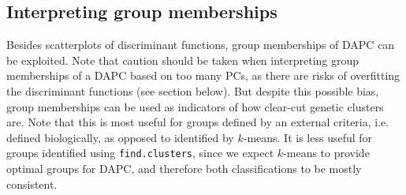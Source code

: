 \documentclass{article}
\begin{document}
\subsection{Interpreting group memberships}
Besides scatterplots of discriminant functions, group memberships of DAPC can be exploited.
Note that caution should be taken when interpreting group memberships of a DAPC based on too many
PCs, as there are risks of overfitting the discriminant functions (see section below).
But despite this possible bias, group memberships can be used as indicators of how
clear-cut genetic clusters are.
Note that this is most useful for groups defined by an external criteria, i.e. defined biologically, as opposed to identified by $k$-means.
It is less useful for groups identified using \texttt{find.clusters}, since we expect $k$-means to
provide optimal groups for DAPC, and therefore both classifications to be mostly consistent.
\\
\end{document}
